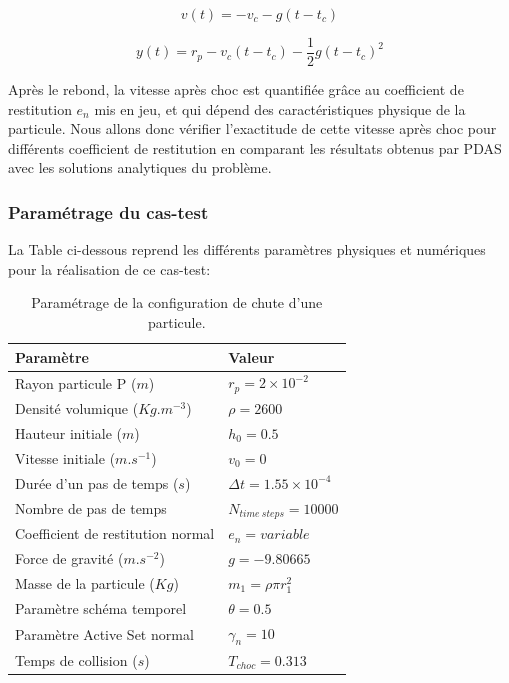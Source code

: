 \begin{equation}
    v(t) = - v_c - g(t-t_c)
\end{equation}

\begin{equation}
    y(t) = r_p - v_c(t-t_c) - \frac{1}{2}g(t-t_c)^2
\end{equation}

Après le rebond, la vitesse après choc est quantifiée grâce au coefficient de restitution $e_n$ mis en jeu, et qui dépend des caractéristiques physique de la particule. Nous allons donc vérifier l'exactitude de cette vitesse après choc pour différents coefficient de restitution en comparant les résultats obtenus par PDAS avec les solutions analytiques du problème.
    
\subsubsection{Paramétrage du cas-test}

La Table ci-dessous reprend les différents paramètres physiques et numériques pour la réalisation de ce cas-test:

\begin{center}
\begin{table}[!h]
\begin{tabular}{ |p{5.75cm}|p{6.8cm}| }
 \hline \rowcolor{lightgray}
 Paramètre& Valeur\\
 \hline
 Rayon particule P  ($m$) & $r_p = 2\times10^{-2}$\\
 Densité volumique ($Kg.m^{-3}$)& $\rho = 2600$\\
 Hauteur initiale ($m$) & $h_0 = 0.5$\\
 Vitesse initiale  ($m.s^{-1}$)  &$v_0 = 0$\\
 Durée d'un pas de temps ($s$)&   $\Delta t = 1.55\times10^{-4}$\\
 Nombre de pas de temps& $N_{time\ steps} = 10000$\\
 Coefficient de restitution normal & $e_n = variable$\\
 Force de gravité ($m.s^{-2}$)& $g = -9.80665$\\
 Masse de la particule ($Kg$)  &$m_1 = \rho \pi r_1^{2}$\\
 Paramètre schéma temporel & $\theta = 0.5$\\
 Paramètre Active Set normal &$\gamma_n = 10$\\
 Temps de collision ($s$)& $T_{choc} = 0.313$\\
 \hline
\end{tabular}
\caption{Paramétrage de la configuration de chute d'une particule.}
\end{table}
\end{center}
    
